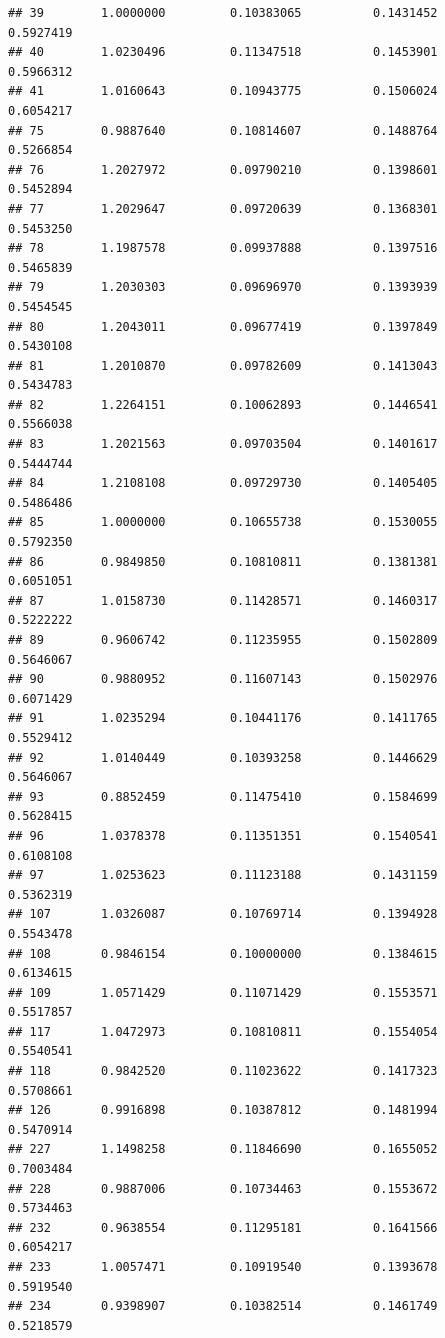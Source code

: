 \documentclass[]{article}
\begin{document}
\begin{verbatim}
## 39        1.0000000         0.10383065          0.1431452        0.5927419
## 40        1.0230496         0.11347518          0.1453901        0.5966312
## 41        1.0160643         0.10943775          0.1506024        0.6054217
## 75        0.9887640         0.10814607          0.1488764        0.5266854
## 76        1.2027972         0.09790210          0.1398601        0.5452894
## 77        1.2029647         0.09720639          0.1368301        0.5453250
## 78        1.1987578         0.09937888          0.1397516        0.5465839
## 79        1.2030303         0.09696970          0.1393939        0.5454545
## 80        1.2043011         0.09677419          0.1397849        0.5430108
## 81        1.2010870         0.09782609          0.1413043        0.5434783
## 82        1.2264151         0.10062893          0.1446541        0.5566038
## 83        1.2021563         0.09703504          0.1401617        0.5444744
## 84        1.2108108         0.09729730          0.1405405        0.5486486
## 85        1.0000000         0.10655738          0.1530055        0.5792350
## 86        0.9849850         0.10810811          0.1381381        0.6051051
## 87        1.0158730         0.11428571          0.1460317        0.5222222
## 89        0.9606742         0.11235955          0.1502809        0.5646067
## 90        0.9880952         0.11607143          0.1502976        0.6071429
## 91        1.0235294         0.10441176          0.1411765        0.5529412
## 92        1.0140449         0.10393258          0.1446629        0.5646067
## 93        0.8852459         0.11475410          0.1584699        0.5628415
## 96        1.0378378         0.11351351          0.1540541        0.6108108
## 97        1.0253623         0.11123188          0.1431159        0.5362319
## 107       1.0326087         0.10769714          0.1394928        0.5543478
## 108       0.9846154         0.10000000          0.1384615        0.6134615
## 109       1.0571429         0.11071429          0.1553571        0.5517857
## 117       1.0472973         0.10810811          0.1554054        0.5540541
## 118       0.9842520         0.11023622          0.1417323        0.5708661
## 126       0.9916898         0.10387812          0.1481994        0.5470914
## 227       1.1498258         0.11846690          0.1655052        0.7003484
## 228       0.9887006         0.10734463          0.1553672        0.5734463
## 232       0.9638554         0.11295181          0.1641566        0.6054217
## 233       1.0057471         0.10919540          0.1393678        0.5919540
## 234       0.9398907         0.10382514          0.1461749        0.5218579

\end{verbatim}
\end{document}
